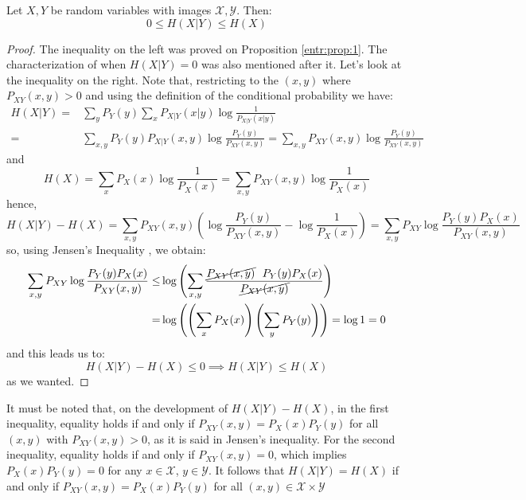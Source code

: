 \begin{nprop}\label{entr:prop:2}
Let $X,Y$ be random variables with images $\mathcal X, \mathcal Y$. Then:
$$
0 \leq H(X|Y) \leq H(X)
$$
\end{nprop}
\begin{proof}

The inequality on the left was proved on Proposition \cref{entr:prop:1}. The characterization of when $H(X|Y) = 0$ was also mentioned after it.  Let's look at the inequality on the right. Note that, restricting to the $(x,y)$ where $P_{XY}(x,y) > 0$ and using the definition of the conditional probability we have:
\begin{align*}
H(X|Y) = & \sum_y P_Y(y) \sum_x P_{X|Y}(x|y)\log \frac{1}{P_{X|Y}(x|y)}\\ = & \sum_{x,y} P_Y(y) P_{X|Y}(x,y) \log \frac{P_Y(y)}{P_{XY}(x,y)} = \sum_{x,y} P_{XY}(x,y)\log \frac{P_Y(y)}{P_{XY}(x,y)} 
\end{align*}
and 
$$
H(X) = \sum_x P_X(x) \log \frac{1}{P_X(x)} = \sum_{x,y}P_{XY}(x,y) \log \frac{1}{P_X(x)}
$$
hence,
\begin{equation}\label{eq:dif-expr-mi}
H(X|Y) - H(X) = \sum_{x,y}P_{XY}(x,y) \left( \log \frac{P_Y(y)}{P_{XY}(x,y)} - \log \frac{1}{P_X(x)}\right) = \sum_{x,y}P_{XY}\log \frac{P_Y(y)P_X(x)}{P_{XY}(x,y)}
\end{equation}
so, using Jensen's Inequality , we obtain:
\begin{align*}
\sum_{x,y}P_{XY}\log \frac{P_Y(y)P_X(x)}{P_{XY}(x,y)} \leq & \log \left( \sum_{x,y}\frac{ \cancel{P_{XY}(x,y)} \ \  P_Y(y) P_X(x)}{\cancel{P_{XY}(x,y)}} \right) \\ = & \log\left( \left( \sum_x P_X(x) \right) \left(\sum_y P_Y(y)\right)\right) = \log 1 = 0
\end{align*}
and this leads us to:
$$
H(X|Y) - H(X) \leq 0 \implies H(X|Y) \leq H(X)
$$
as we wanted.
\end{proof}

It must be noted that, on the development of $H(X|Y) - H(X)$, in the first inequality, equality holds if and only if $P_{XY}(x,y) = P_X(x) P_Y(y)$ for all $(x,y)$ with $P_{XY} (x,y) > 0$, as it is said in Jensen's inequality. For the second inequality, equality holds if and only if $P_{XY}(x,y) = 0$, which implies $P_X(x)P_Y(y) = 0$ for any $x\in \mathcal X$, $y \in \mathcal Y$. It follows that $H(X|Y) = H(X)$ if and only if $P_{XY}(x,y) = P_X(x)P_Y(y)$ for all $(x,y) \in \mathcal X \times \mathcal Y$

